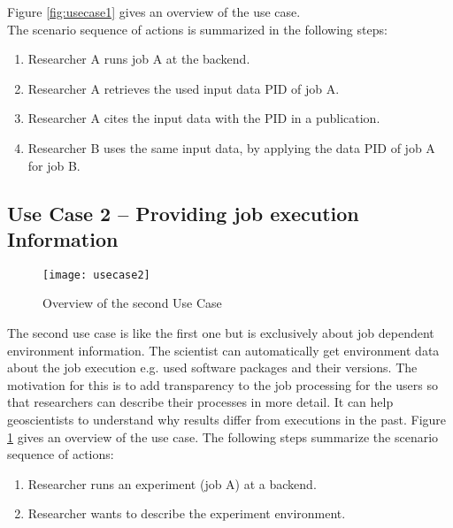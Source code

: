 \documentclass[draft,final]{vutinfth} %
\begin{document}
Figure \ref{fig:usecase1} gives an overview of the use case. \\

The scenario sequence of actions is summarized in the following steps: \\

\begin{enumerate}
	\item Researcher A runs job A at the backend.
	\item Researcher A retrieves the used input data PID of job A.
	\item Researcher A cites the input data with the PID in a publication.
	\item Researcher B uses the same input data, by applying the data PID of job A for job B.  
\end{enumerate}

\subsection{Use Case 2 – Providing job execution Information}\label{UseCase2}
\begin{figure}[h]
	\centering
	\texttt{[image: usecase2]}
	\caption{Overview of the second Use Case}
	\label{fig:usecase2} %
\end{figure}

The second use case is like the first one but is exclusively about job dependent environment information. The scientist can automatically get environment data about the job execution e.g. used software packages and their versions. The motivation for this is to add transparency to the job processing for the users so that researchers can describe their processes in more detail. It can help geoscientists to understand why results differ from executions in the past. Figure \ref{fig:usecase2} gives an overview of the use case. 
The following steps summarize the scenario sequence of actions: \\
\begin{enumerate}
	\item Researcher runs an experiment (job A) at a backend.
	\item Researcher wants to describe the experiment environment.
\end{enumerate}
\end{document}
